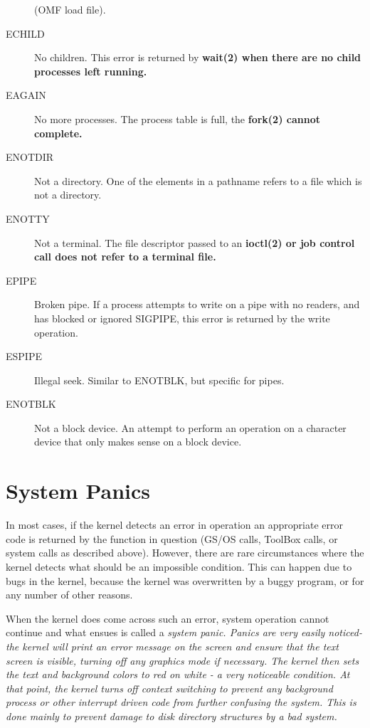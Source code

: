 \documentclass{report}
\begin{document}
\begin{description}
	(OMF load file).
\item[ECHILD]
	No children. This error is returned by \bf wait\rm(2) when there
	are no child processes left running.
\item[EAGAIN]
	No more processes. The process table is full, the \bf fork\rm(2)
	cannot complete.
\item[ENOTDIR]
	Not a directory. One of the elements in a pathname refers to a file
	which is not a directory.
\item[ENOTTY]
	Not a terminal. The file descriptor passed to an \bf ioctl\rm(2)
	or job control call does not refer to a terminal file.
\item[EPIPE]
	Broken pipe. If a process attempts to write on a pipe with no
	readers, and has blocked or ignored SIGPIPE, this error is
	returned by the write operation.
\item[ESPIPE]
	Illegal seek. Similar to ENOTBLK, but specific for pipes.
\item[ENOTBLK]
	Not a block device. An attempt to perform an operation on a character
	device that only makes sense on a block device.
\end{description}



\section{System Panics}

In most cases, if the kernel detects an
error in operation an appropriate error code is returned by the
function in question (GS/OS calls, ToolBox calls, or system calls
as described above). However, there are rare circumstances where
the kernel detects what should be an impossible condition. This
can happen due to bugs in the kernel, because the kernel was
overwritten by a buggy program, or for any number of other
reasons.

When the kernel does come across such an
error, system operation cannot continue and what ensues is called
a \em system panic\rm. Panics are very easily noticed- the kernel
will print an error message on the screen and ensure that the
text screen is visible, turning off any graphics mode if
necessary. The kernel then sets the text and background colors to
red on white - a very noticeable condition. At that point, the
kernel turns off 
context switching to prevent any background
process or other interrupt driven code from further confusing the
system. This is done mainly to prevent damage to disk directory
structures by a bad system.
\end{document}

